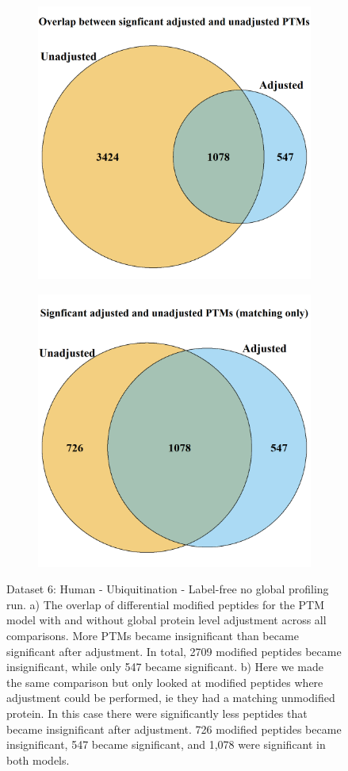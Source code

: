 \documentclass[mcp]{article}
\numberwithin{table}{section}
\begin{document}
\begin{figure}[h!]
\centering
 \begin{subfigure}{\textwidth}
 \centering
	\includegraphics[height=.55\textwidth]{images/usp30_venn_diagramm}
	\caption{}
	\label{fig:data6_vd1}
 \end{subfigure}
 \begin{subfigure}{\textwidth}
 \centering
	\includegraphics[height=.55\textwidth]{images/usp30_venn_diagramm_matching_only}
	\caption{}
	\label{fig:data6_vd2}
 \end{subfigure}
 \caption{Dataset 6: Human - Ubiquitination - Label-free no global profiling run. a) The overlap of differential modified peptides for the PTM model with and without global protein level adjustment across all comparisons. More PTMs became insignificant than became significant after adjustment. In total, 2709 modified peptides became insignificant, while only 547 became significant. b) Here we made the same comparison but only looked at modified peptides where adjustment could be performed, ie they had a matching unmodified protein. In this case there were significantly less peptides that became insignificant after adjustment. 726 modified peptides became insignificant, 547 became significant, and 1,078 were significant in both models.}
\label{fig:data6_plots}
\end{figure}
\end{document}
